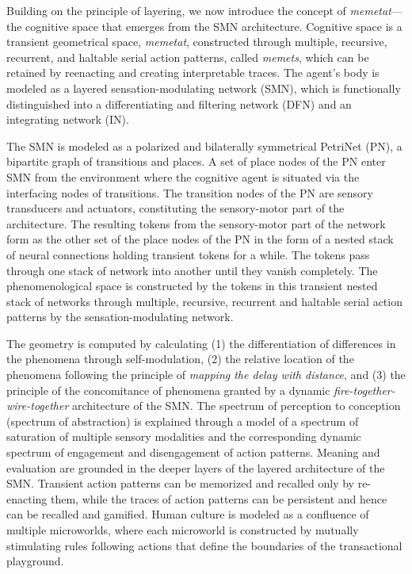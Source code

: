 Building on the principle of layering, we now introduce the concept of \textit{memetat}—the cognitive space that emerges from the SMN architecture. Cognitive space is a transient geometrical space, \textit{memetat}, constructed through multiple, recursive, recurrent, and haltable serial action patterns, called \textit{memets}, which can be retained by reenacting and creating interpretable traces. The agent's body is modeled as a layered sensation-modulating network (SMN), which is functionally distinguished into a differentiating and filtering network (DFN) and an integrating network (IN).

The SMN is modeled as a polarized and bilaterally symmetrical PetriNet (PN), a bipartite graph of transitions and places. A set of place nodes of the PN enter SMN from the environment where the cognitive agent is situated via the interfacing nodes of transitions. The transition nodes of the PN are sensory transducers and actuators, constituting the sensory-motor part of the architecture. The resulting tokens from the sensory-motor part of the network form as the other set of the place nodes of the PN in the form of a nested stack of neural connections holding transient tokens for a while. The tokens pass through one stack of network into another until they vanish completely. The phenomenological space is constructed by the tokens in this transient nested stack of networks through multiple, recursive, recurrent and haltable serial action patterns by the sensation-modulating network.

The geometry is computed by calculating (1) the differentiation of differences in the phenomena through self-modulation, (2) the relative location of the phenomena following the principle of \textit{mapping the delay with distance}, and (3) the principle of the concomitance of phenomena granted by a dynamic \textit{fire-together-wire-together} architecture of the SMN. The spectrum of perception to conception (spectrum of abstraction) is explained through a model of a spectrum of saturation of multiple sensory modalities and the corresponding dynamic spectrum of engagement and disengagement of action patterns. Meaning and evaluation are grounded in the deeper layers of the layered architecture of the SMN. Transient action patterns can be memorized and recalled only by re-enacting them, while the traces of action patterns can be persistent and hence can be recalled and gamified. Human culture is modeled as a confluence of multiple microworlds, where each microworld is constructed by mutually stimulating rules following actions that define the boundaries of the transactional playground.


